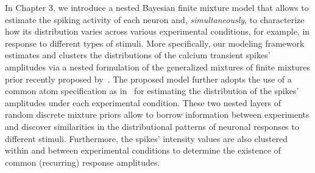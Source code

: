In Chapter 3, we introduce a nested Bayesian finite mixture model that allows to estimate the spiking activity of each neuron and, \textit{simultaneously}, to characterize how its distribution varies across various experimental conditions, for example, in response to different types of stimuli.
More specifically, our modeling framework estimates and clusters the distributions of the calcium transient spikes’ amplitudes via a nested formulation of the generalized mixtures of finite mixtures prior recently proposed by~\citet{fruhwirthschnatter2020}. The proposed model further adopts the use of a common atom specification as in~\citet{denti2021} for estimating the distribution of the spikes’ amplitudes under each experimental condition. 
These two nested layers of random discrete mixture priors allow to borrow information between experiments and discover similarities in the distributional patterns of neuronal responses to different stimuli. Furthermore, the spikes’ intensity values are also clustered within and between experimental conditions to determine the existence of common (recurring) response amplitudes.










